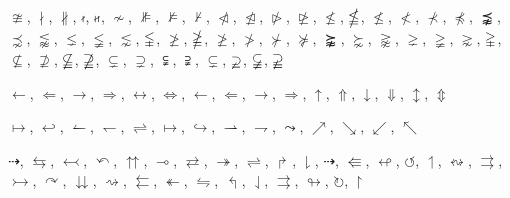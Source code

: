 \documentclass[a4paper,11pt]{article}
\begin{document}
\vspace{1em}





\noindent
$\ncong$, $\nmid$, $\nparallel$, $\nshortmid$, $\nshortparallel$, $\nsim$, $\nVDash$, $\nvDash$, $\nvdash$, $\ntriangleleft$, $\ntrianglelefteq$,
$\ntriangleright$, $\ntrianglerighteq$, $\nleq$, $\nleqq$, $\nleqslant$, $\nless$, $\nprec$, $\npreceq$, $\precnapprox$, $\precnsim$, $\lnapprox$,
$\lneq$, $\lneqq$, $\lnsim$, $\lvertneqq$, $\ngeq$, $\ngeqq$, $\ngeqslant$, $\ngtr$, $\nsucc$, $\nsucceq$, $\succnapprox$,
$\succnsim$, $\gnapprox$, $\gneq$, $\gneqq$, $\gnsim$, $\gvertneqq$, $\nsubseteq$, $\nsupseteq$, $\nsubseteqq$, $\nsupseteqq$, $\subsetneq$,
$\supsetneq$, $\subsetneqq$, $\supsetneqq$, $\varsubsetneq$, $\varsupsetneq$, $\varsubsetneqq$,
$\varsupsetneqq$

\vspace{1em}





\noindent
$\leftarrow$, $\Leftarrow$, $\rightarrow$, $\Rightarrow$, $\leftrightarrow$, $\Leftrightarrow$, $\longleftarrow$, $\Longleftarrow$, $\longrightarrow$, $\Longrightarrow$,
$\uparrow$, $\Uparrow$, $\downarrow$, $\Downarrow$, $\updownarrow$, $\Updownarrow$

\vspace{1em}





\noindent
$\mapsto$, $\hookleftarrow$, $\leftharpoonup$, $\leftharpoondown$, $\rightleftharpoons$, $\longmapsto$, $\hookrightarrow$, $\rightharpoonup$, $\rightharpoondown$, $\leadsto$, $\nearrow$,
$\searrow$, $\swarrow$, $\nwarrow$

\vspace{1em}





\noindent
$\dashrightarrow$, $\leftrightarrows$, $\leftarrowtail$, $\curvearrowleft$, $\upuparrows$, $\multimap$, $\rightleftarrows$, $\twoheadrightarrow$,
$\rightleftharpoons$, $\Rsh$, $\downharpoonright$, $\dashrightarrow$, $\Lleftarrow$,
$\looparrowleft$, $\circlearrowleft$, $\upharpoonleft$, $\leftrightsquigarrow$, $\rightrightarrows$, $\rightarrowtail$, $\curvearrowright$, $\downdownarrows$,
$\rightsquigarrow$, $\leftleftarrows$, $\twoheadleftarrow$, $\leftrightharpoons$, $\Lsh$, $\downharpoonleft$,
$\rightrightarrows$, $\looparrowright$, $\circlearrowright$, $\upharpoonright$
\end{document}

